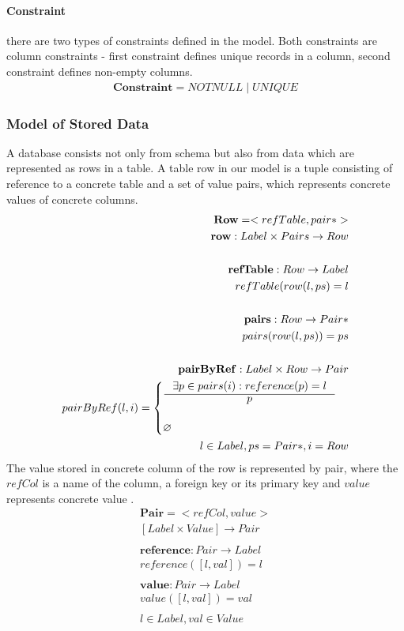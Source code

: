 \documentclass[11pt]{article}
\begin{document}
\paragraph{Constraint} there are two types of constraints defined in the model. Both constraints are column constraints - first constraint defines unique records in a column, second constraint defines non-empty columns.
\begin{align*}
	\mathbf{Constraint} = NOTNULL \; | \; UNIQUE 
\end{align*}


\subsubsection{Model of Stored Data}
A database consists not only from schema but also from data which are represented as rows in a table. A table row in our model is a tuple consisting of reference to a concrete table and a set of value pairs, which represents concrete values of concrete columns.
\begin{align*}
	\mathbf{Row} = < refTable, pair* > \\
	\mathbf{row} : Label \times Pairs \rightarrow Row \\ \\
	\mathbf{refTable} : Row \rightarrow Label \\
	refTable(row(l, ps) = l \\ \\
	\mathbf{pairs} : Row \rightarrow Pair* \\
	pairs(row(l, ps)) = ps \\ \\
	\mathbf{pairByRef} : Label \times Row \rightarrow Pair \\
	pairByRef(l,i) = \begin{cases}
		\inference{\exists p \in pairs(i) : reference(p) = l}{p} \\ \\
			\varnothing
		\end{cases}\\
	 l \in Label, ps = Pair*, i = Row
\end{align*}
The value stored in concrete column of the row is represented by pair, where the $refCol$ is a name of the column, a foreign key or its primary key and $value$ represents concrete value .
\begin{align*}
	\mathbf{Pair} = < refCol, value > \\
	[Label \times Value] \rightarrow Pair\\ \\
	\mathbf{reference} : Pair \rightarrow Label \\
	reference([l,val]) = l \\ \\
	\mathbf{value} : Pair \rightarrow Label \\ 
	value([l,val]) = val \\ \\
	l \in Label, val \in Value
\end{align*}
\end{document}
